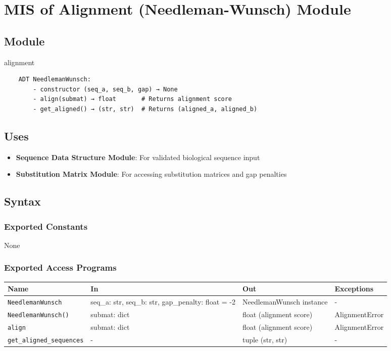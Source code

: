 \documentclass[12pt, titlepage]{article}
\begin{document}
\section{MIS of Alignment (Needleman-Wunsch) Module} \label{mNW}

\subsection{Module}
alignment

\begin{verbatim}
    ADT NeedlemanWunsch:
        - constructor (seq_a, seq_b, gap) → None
        - align(submat) → float       # Returns alignment score
        - get_aligned() → (str, str)  # Returns (aligned_a, aligned_b)
\end{verbatim}

\subsection{Uses}

\begin{itemize}
    \item \textbf{Sequence Data Structure Module}: For validated biological sequence input
    \item \textbf{Substitution Matrix Module}: For accessing substitution matrices and gap penalties
\end{itemize}

\subsection{Syntax}

\subsubsection{Exported Constants}

None

\subsubsection{Exported Access Programs}

\begin{center}
\begin{tabular}{p{4cm} p{4cm} p{3cm} p{2cm}}
\hline
\textbf{Name} & \textbf{In} & \textbf{Out} & \textbf{Exceptions} \\
\hline
\texttt{NeedlemanWunsch} & seq\_a: str, seq\_b: str, gap\_penalty: float = -2 & NeedlemanWunsch instance & - \\
\hline
\texttt{NeedlemanWunsch()} & submat: dict & float (alignment score) & AlignmentError \\
\hline
\texttt{align} & submat: dict & float (alignment score) & AlignmentError \\
\hline
\texttt{get\_aligned\_sequences} & - & tuple (str, str) & - \\
\hline
\end{tabular}
\end{center}
\end{document}

